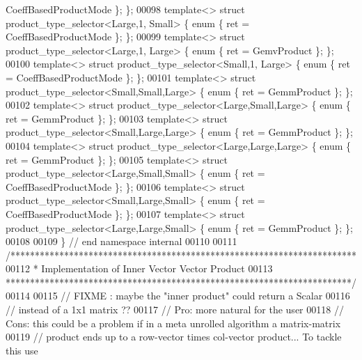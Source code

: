 \begin{DoxyCode}
      CoeffBasedProductMode \}; \};
00098 \textcolor{keyword}{template}<>              \textcolor{keyword}{struct }product\_type\_selector<Large,1,    Small>  \{ \textcolor{keyword}{enum} \{ ret = 
      CoeffBasedProductMode \}; \};
00099 \textcolor{keyword}{template}<>              \textcolor{keyword}{struct }product\_type\_selector<Large,1,    Large>  \{ \textcolor{keyword}{enum} \{ ret = GemvProduct \}; \};
00100 \textcolor{keyword}{template}<>              \textcolor{keyword}{struct }product\_type\_selector<Small,1,    Large>  \{ \textcolor{keyword}{enum} \{ ret = 
      CoeffBasedProductMode \}; \};
00101 \textcolor{keyword}{template}<>              \textcolor{keyword}{struct }product\_type\_selector<Small,Small,Large>  \{ \textcolor{keyword}{enum} \{ ret = GemmProduct \}; \};
00102 \textcolor{keyword}{template}<>              \textcolor{keyword}{struct }product\_type\_selector<Large,Small,Large>  \{ \textcolor{keyword}{enum} \{ ret = GemmProduct \}; \};
00103 \textcolor{keyword}{template}<>              \textcolor{keyword}{struct }product\_type\_selector<Small,Large,Large>  \{ \textcolor{keyword}{enum} \{ ret = GemmProduct \}; \};
00104 \textcolor{keyword}{template}<>              \textcolor{keyword}{struct }product\_type\_selector<Large,Large,Large>  \{ \textcolor{keyword}{enum} \{ ret = GemmProduct \}; \};
00105 \textcolor{keyword}{template}<>              \textcolor{keyword}{struct }product\_type\_selector<Large,Small,Small>  \{ \textcolor{keyword}{enum} \{ ret = 
      CoeffBasedProductMode \}; \};
00106 \textcolor{keyword}{template}<>              \textcolor{keyword}{struct }product\_type\_selector<Small,Large,Small>  \{ \textcolor{keyword}{enum} \{ ret = 
      CoeffBasedProductMode \}; \};
00107 \textcolor{keyword}{template}<>              \textcolor{keyword}{struct }product\_type\_selector<Large,Large,Small>  \{ \textcolor{keyword}{enum} \{ ret = GemmProduct \}; \};
00108 
00109 \} \textcolor{comment}{// end namespace internal}
00110 
00111 \textcolor{comment}{/***********************************************************************}
00112 \textcolor{comment}{*  Implementation of Inner Vector Vector Product}
00113 \textcolor{comment}{***********************************************************************/}
00114 
00115 \textcolor{comment}{// FIXME : maybe the "inner product" could return a Scalar}
00116 \textcolor{comment}{// instead of a 1x1 matrix ??}
00117 \textcolor{comment}{// Pro: more natural for the user}
00118 \textcolor{comment}{// Cons: this could be a problem if in a meta unrolled algorithm a matrix-matrix}
00119 \textcolor{comment}{// product ends up to a row-vector times col-vector product... To tackle this use}

\end{DoxyCode}

